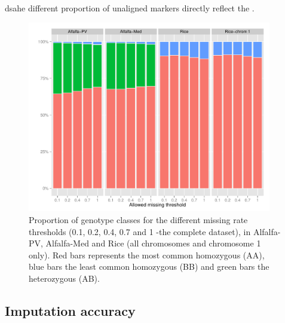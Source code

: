 dsahe different proportion of unaligned markers directly reflect the .

\begin{figure}
\includegraphics[width=0.95\textwidth]{Fig01_class_breakdown_all.pdf}
\caption[Proportions of genotype classes]{​Proportion of genotype classes for the different missing rate thresholds (0.1, 0.2, 0.4, 0.7 and 1 -the complete dataset), in Alfalfa-PV, Alfalfa-Med and Rice (all chromosomes and chromosome 1 only). Red bars represents the most common homozygous (AA), blue bars the least common homozygous (BB) and green bars the heterozygous (AB).}
\label{fig:genotype_classes}
\end{figure}

\subsection{Imputation accuracy}
\label{sec:imputation_accuracy}  

